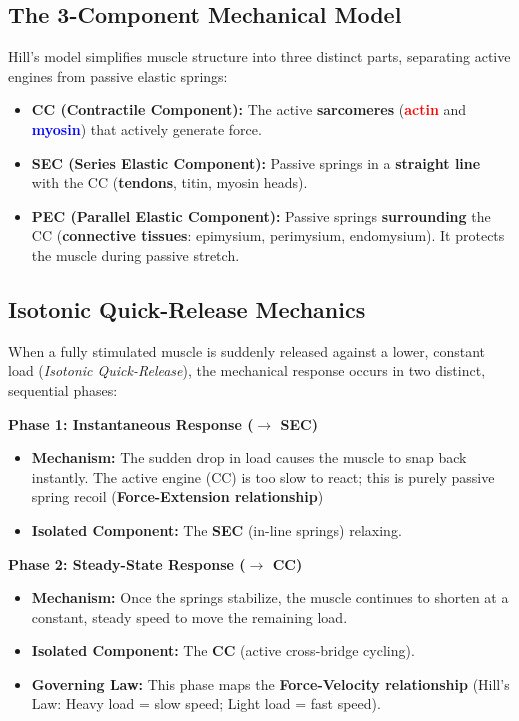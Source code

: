 \documentclass{article}
\begin{document}
\subsection{The 3-Component Mechanical Model}
Hill's model simplifies muscle structure into three distinct parts, separating active engines from passive elastic springs:
\begin{itemize}
    \item \textbf{CC (Contractile Component):} The active \textbf{sarcomeres} (\textbf{\textcolor{red}{actin}} and \textbf{\textcolor{blue}{myosin}}) that actively generate force.
    \item \textbf{SEC (Series Elastic Component):} Passive springs in a \textbf{straight line} with the CC (\textbf{tendons}, titin, myosin heads). 
    \item \textbf{PEC (Parallel Elastic Component):} Passive springs \textbf{surrounding} the CC (\textbf{connective tissues}: epimysium, perimysium, endomysium). It protects the muscle during passive stretch.
\end{itemize}

\subsection{Isotonic Quick-Release Mechanics}
When a fully stimulated muscle is suddenly released against a lower, constant load (\textit{Isotonic Quick-Release}), the mechanical response occurs in two distinct, sequential phases:

\textbf{Phase 1: Instantaneous Response ($\rightarrow$ SEC)}

\begin{itemize}
    \item \textbf{Mechanism:} The sudden drop in load causes the muscle to snap back instantly. The active engine (CC) is too slow to react; this is purely passive spring recoil (\textbf{Force-Extension relationship})
    \item \textbf{Isolated Component:} The \textbf{SEC} (in-line springs) relaxing.
\end{itemize}

\textbf{Phase 2: Steady-State Response ($\rightarrow$ CC)}

\begin{itemize}
    \item \textbf{Mechanism:} Once the springs stabilize, the muscle continues to shorten at a constant, steady speed to move the remaining load.
    \item \textbf{Isolated Component:} The \textbf{CC} (active cross-bridge cycling).
    \item \textbf{Governing Law:} This phase maps the \textbf{Force-Velocity relationship} (Hill's Law: Heavy load = slow speed; Light load = fast speed).
\end{itemize}
\end{document}
